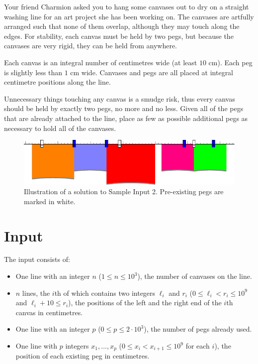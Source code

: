 
Your friend Charmion asked you to hang some canvases out to dry on a straight
washing line for an art project she has been working on.
The canvases are artfully arranged such that none of them overlap, although
they may touch along the edges.
For stability, each canvas must be held by two pegs, but because the canvases
are very rigid, they can be held from anywhere.

Each canvas is an integral number of centimetres wide (at least $10$ cm).
Each peg is slightly less than $1$ cm wide. Canvases and pegs are all placed at
integral centimetre positions along the line.

Unnecessary things touching any canvas is a smudge risk, thus every canvas
should be held by exactly two pegs, no more and no less. Given all of the pegs
that are already attached to the line, place as few as possible additional pegs
as necessary to hold all of the canvases.

\begin{figure}[h!]
  \centering
  \includegraphics[width=1.0\textwidth]{sample}
  \caption{Illustration of a solution to Sample Input 2. Pre-existing pegs are marked in white.}
  \label{fig:collage}
\end{figure}
\vspace{-0.4cm}

\section*{Input}

The input consists of:
\begin{itemize}
\item One line with an integer $n$ ($1 \leq n \leq 10^3$), the number of
      canvases on the line.
\item $n$ lines, the $i$th of which contains two integers $\ell_i$ and $r_i$
      ($0 \leq \ell_i < r_i \leq 10^9$ and $\ell_i + 10 \le r_i$), the
      positions of the left and the right end of the $i$th canvas in centimetres.
\item One line with an integer $p$ ($0 \leq p \leq 2 \cdot 10^3$), the number of
      pegs already used.
\item One line with $p$ integers $x_1, \ldots, x_p$ ($0 \leq x_i < x_{i+1}
  \leq 10^9$ for each $i$), the position of each existing peg in
    centimetres.
\end{itemize}

